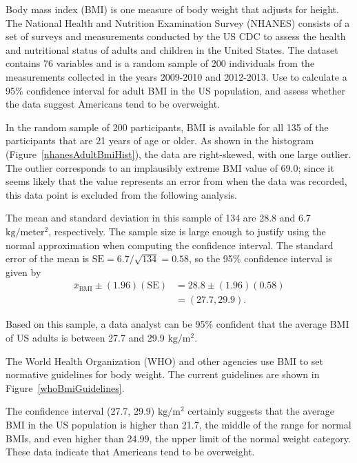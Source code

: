 \begin{examplewrap}
\begin{nexample}{Body mass index (BMI) is one measure of body weight that adjusts for height. The National Health and Nutrition Examination Survey (NHANES) consists of a set of surveys and measurements conducted by the US CDC to assess the health and nutritional status of adults and children in the United States. The dataset  contains 76 variables and is a random sample of 200 individuals from the measurements collected in the years 2009-2010 and 2012-2013.\footnotemark{} Use  to calculate a 95\% confidence interval for adult BMI in the US population, and assess whether the data suggest Americans tend to be overweight. \label{exNhanesBmi}}
	
	In the random sample of 200 participants, BMI is available for all 135 of the participants that are 21 years of age or older. As shown in the histogram (Figure~\ref{nhanesAdultBmiHist}), the data are right-skewed, with one large outlier. The outlier corresponds to an implausibly extreme BMI value of 69.0; since it seems likely that the value represents an error from when the data was recorded, this data point is excluded from the following analysis. 
	
	The mean and standard deviation in this sample of 134 are 28.8 and 6.7 $\text{kg}/\text{meter}{^2}$, respectively.  The sample size is large enough to justify using the normal approximation when computing the confidence interval.  The standard error of the mean is $\text{SE} = 6.7/\sqrt{134} = 0.58$, so the 95\% confidence interval is given by 
	\begin{align*}
	\overline{x}_{\text{BMI}} \pm (1.96)(\text{SE}) &= 28.8 \pm (1.96)(0.58) \\
	&= (27.7, 29.9).
	\end{align*}	
	
	Based on this sample, a data analyst can be 95\% confident that the average BMI of US adults is between 27.7 and 29.9 $\text{kg}/\text{m}{^2}$.

The World Health Organization (WHO) and other agencies use BMI to set normative guidelines for body weight. The current guidelines are shown in Figure~\ref{whoBmiGuidelines}. 


The confidence interval (27.7, 29.9) $\text{kg}/\text{m}{^2}$ certainly suggests that the average BMI in the US population is higher than 21.7, the middle of the range for normal BMIs, and even higher than 24.99, the upper limit of the normal weight category. These data indicate that Americans tend to be overweight. 
\end{nexample}
\end{examplewrap}

